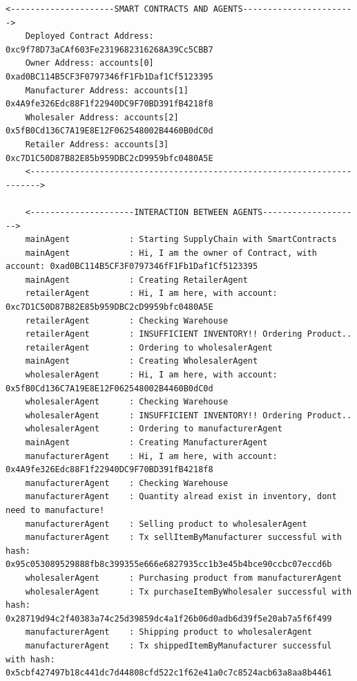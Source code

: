 \begin{itemize}
    \vspace{.5cm}
    \begin{lstlisting}[caption={Agent Interaction (Scenario 3},label={Scenario3}, numbers=none, basicstyle=\ttfamily\tiny]
    <---------------------SMART CONTRACTS AND AGENTS----------------------->
    Deployed Contract Address: 0xc9f78D73aCAf603Fe2319682316268A39Cc5CBB7
    Owner Address: accounts[0] 0xad0BC114B5CF3F0797346fF1Fb1Daf1Cf5123395
    Manufacturer Address: accounts[1] 0x4A9fe326Edc88F1f22940DC9F70BD391fB4218f8
    Wholesaler Address: accounts[2] 0x5fB0Cd136C7A19E8E12F062548002B4460B0dC0d
    Retailer Address: accounts[3] 0xc7D1C50D87B82E85b959DBC2cD9959bfc0480A5E
    <------------------------------------------------------------------------>
    
    <---------------------INTERACTION BETWEEN AGENTS-------------------->
    mainAgent            : Starting SupplyChain with SmartContracts
    mainAgent            : Hi, I am the owner of Contract, with account: 0xad0BC114B5CF3F0797346fF1Fb1Daf1Cf5123395
    mainAgent            : Creating RetailerAgent
    retailerAgent        : Hi, I am here, with account: 0xc7D1C50D87B82E85b959DBC2cD9959bfc0480A5E
    retailerAgent        : Checking Warehouse
    retailerAgent        : INSUFFICIENT INVENTORY!! Ordering Product..
    retailerAgent        : Ordering to wholesalerAgent
    mainAgent            : Creating WholesalerAgent
    wholesalerAgent      : Hi, I am here, with account: 0x5fB0Cd136C7A19E8E12F062548002B4460B0dC0d
    wholesalerAgent      : Checking Warehouse
    wholesalerAgent      : INSUFFICIENT INVENTORY!! Ordering Product..
    wholesalerAgent      : Ordering to manufacturerAgent
    mainAgent            : Creating ManufacturerAgent
    manufacturerAgent    : Hi, I am here, with account: 0x4A9fe326Edc88F1f22940DC9F70BD391fB4218f8
    manufacturerAgent    : Checking Warehouse
    manufacturerAgent    : Quantity alread exist in inventory, dont need to manufacture!
    manufacturerAgent    : Selling product to wholesalerAgent
    manufacturerAgent    : Tx sellItemByManufacturer successful with hash: 0x95c053089529888fb8c399355e666e6827935cc1b3e45b4bce90ccbc07eccd6b
    wholesalerAgent      : Purchasing product from manufacturerAgent
    wholesalerAgent      : Tx purchaseItemByWholesaler successful with hash: 0x28719d94c2f40383a74c25d39859dc4a1f26b06d0adb6d39f5e20ab7a5f6f499
    manufacturerAgent    : Shipping product to wholesalerAgent
    manufacturerAgent    : Tx shippedItemByManufacturer successful with hash: 0x5cbf427497b18c441dc7d44808cfd522c1f62e41a0c7c8524acb63a8aa8b4461

\end{lstlisting}
\end{itemize}
